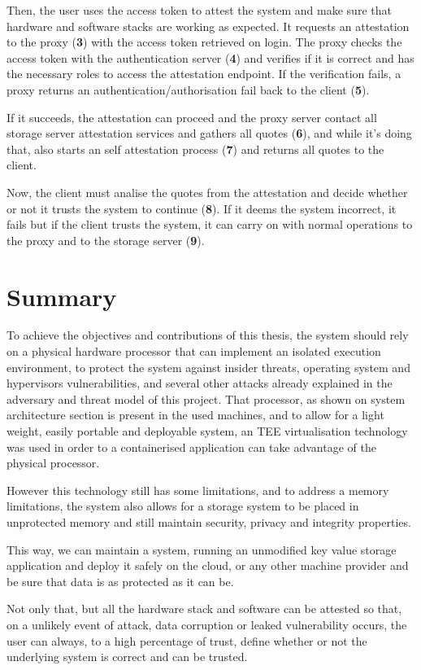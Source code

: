 Then, the user uses the access token to attest the system and make sure that hardware and software stacks are working as expected. It requests an attestation to the proxy (\textbf{3}) with the access token retrieved on login. The proxy checks the access token with the authentication server (\textbf{4}) and verifies if it is correct and has the necessary roles to access the attestation endpoint. If the verification fails, a proxy returns an authentication/authorisation fail back to the client (\textbf{5}). 

If it succeeds, the attestation can proceed and the proxy server contact all storage server attestation services and gathers all quotes (\textbf{6}), and while it's doing that, also starts an self attestation process (\textbf{7}) and returns all quotes to the client. 

Now, the client must analise the quotes from the attestation and decide whether or not it trusts the system to continue (\textbf{8}). If it deems the system incorrect, it fails but if the client trusts the system, it can carry on with normal operations to the proxy and to the storage server (\textbf{9}).

\section{Summary} %
\label{sec:chapter3_summary}

To achieve the objectives and contributions of this thesis, the system should rely on a physical hardware processor that can implement an isolated execution environment, to protect the system against insider threats, operating system and hypervisors vulnerabilities, and several other attacks already explained in the adversary and threat model of this project. That processor, as shown on system architecture section is present in the used machines, and to allow for a light weight, easily portable and deployable system, an TEE virtualisation technology was used in order to a containerised application can take advantage of the physical processor.

However this technology still has some limitations, and to address a memory limitations, the system also allows for a storage system to be placed in unprotected memory and still maintain security, privacy and integrity properties.

This way, we can maintain a system, running an unmodified key value storage application and deploy it safely on the cloud, or any other machine provider and be sure that data is as protected as it can be.

Not only that, but all the hardware stack and software can be attested so that, on a unlikely event of attack, data corruption or leaked vulnerability occurs, the user can always, to a high percentage of trust, define whether or not the underlying system is correct and can be trusted.